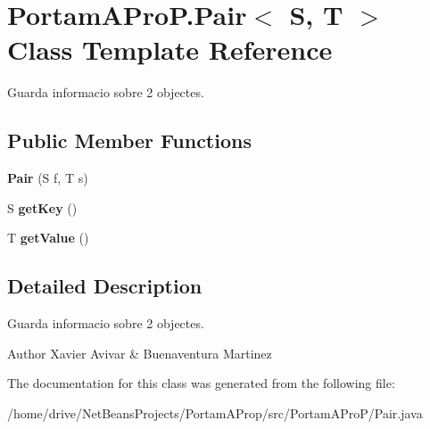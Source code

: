 \hypertarget{class_portam_a_pro_p_1_1_pair}{}\section{Portam\+A\+Pro\+P.\+Pair$<$ S, T $>$ Class Template Reference}
\label{class_portam_a_pro_p_1_1_pair}


Guarda informacio sobre 2 objectes.  


\subsection*{Public Member Functions}
\begin{DoxyCompactItemize}
\item 
\mbox{\label{class_portam_a_pro_p_1_1_pair_a6f26f745a1e27dea3accac8d5b27844a}} 
{\bfseries Pair} (S f, T s)
\item 
\mbox{\label{class_portam_a_pro_p_1_1_pair_a3b047f433b7328c75de00a624c454e4f}} 
S {\bfseries get\+Key} ()
\item 
\mbox{\label{class_portam_a_pro_p_1_1_pair_ad58094c004d557a11a24901ae94e776f}} 
T {\bfseries get\+Value} ()
\end{DoxyCompactItemize}


\subsection{Detailed Description}
Guarda informacio sobre 2 objectes. 

\begin{DoxyAuthor}{Author}
Xavier Avivar \& Buenaventura Martinez 
\end{DoxyAuthor}


The documentation for this class was generated from the following file\+:\begin{DoxyCompactItemize}
\item 
/home/drive/\+Net\+Beans\+Projects/\+Portam\+A\+Prop/src/\+Portam\+A\+Pro\+P/Pair.\+java\end{DoxyCompactItemize}
